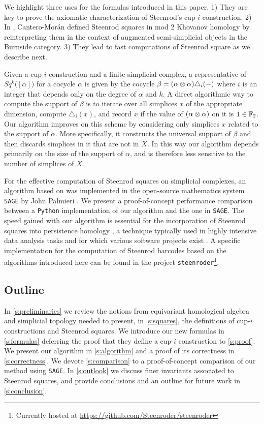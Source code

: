 We highlight three uses for the formulas introduced in this paper.
1) They are key to prove the axiomatic characterization of Steenrod's cup-$i$ construction.
2) In \cite{cantero-moran2020khovanov}, Cantero-Mor\'an defined Steenrod squares in mod 2 Khovanov homology \cite{khovanov2000categorification} by reinterpreting them in the context of augmented semi-simplicial objects in the Burnside category.
3) They lead to fast computations of Steenrod square as we describe next.

Given a cup-$i$ construction and a finite simplicial complex, a representative of $Sq^k \big( [\alpha] \big)$ for a cocycle $\alpha$ is given by the cocycle $\beta = (\alpha \otimes \alpha) \triangle_{i}(-)$ where $i$ is an integer that depends only on the degree of $\alpha$ and $k$.
A direct algorithmic way to compute the support of $\beta$ is to iterate over all simplices $x$ of the appropriate dimension, compute $\triangle_i(x)$, and record $x$ if the value of $(\alpha \otimes \alpha)$ on it is $1 \in {\mathbb{F}_2}$.
Our algorithm improves on this scheme by considering only simplices $x$ related to the support of $\alpha$.
More specifically, it constructs the universal support of $\beta$ and then discards simplices in it that are not in $X$.
In this way our algorithm depends primarily on the size of the support of $\alpha$, and is therefore less sensitive to the number of simplices of $X$.

For the effective computation of Steenrod squares on simplicial complexes, an algorithm based on \cite{gonzalez-diaz1999steenrod} was implemented in the open-source mathematics system \verb|SAGE| by John Palmieri \cite{sagemath}.
We present a proof-of-concept performance comparison between a \verb|Python| implementation of our algorithm and the one in \verb|SAGE|.
The speed gained with our algorithm is essential for the incorporation of Steenrod squares into persistence homology \cite{medina2022per_st}, a technique typically used in highly intensive data analysis tasks \cite{carlsson2008images, chan2013viral, lee2017quantifying} and for which various software projects exist \cite{bauer2021ripser, gudhi, medina2021giotto}.
A specific implementation for the computation of Steenrod barcodes based on the algorithms introduced here can be found in the project \texttt{steenroder}\footnote{Currently hosted at \url{https://github.com/Steenroder/steenroder}}.

\subsection*{Outline}

In \cref{s:preliminaries} we review the notions from equivariant homological algebra and simplicial topology needed to present, in \cref{s:squares}, the definitions of cup-$i$ constructions and Steenrod squares.
We introduce our new formulas in \cref{s:formulas} deferring the proof that they define a cup-$i$ construction to \cref{s:proof}.
We present our algorithm in \cref{s:algorithm} and a proof of its correctness in \cref{s:correctness}.
We devote \cref{s:comparison} to a proof-of-concept comparison of our method using \verb|SAGE|.
In \cref{s:outlook} we discuss finer invariants associated to Steenrod squares, and provide conclusions and an outline for future work in \cref{s:conclusion}.